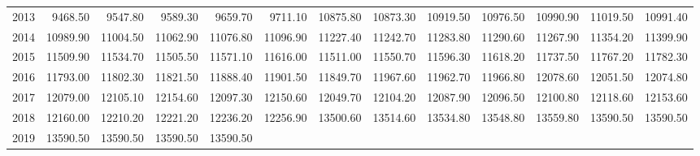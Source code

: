 \begin{longtable}{rrrrrrrrrrrrr}
  2013 & 9468.50 & 9547.80 & 9589.30 & 9659.70 & 9711.10 & 10875.80 & 10873.30 & 10919.50 & 10976.50 & 10990.90 & 11019.50 & 10991.40 \\ 
  2014 & 10989.90 & 11004.50 & 11062.90 & 11076.80 & 11096.90 & 11227.40 & 11242.70 & 11283.80 & 11290.60 & 11267.90 & 11354.20 & 11399.90 \\ 
  2015 & 11509.90 & 11534.70 & 11505.50 & 11571.10 & 11616.00 & 11511.00 & 11550.70 & 11596.30 & 11618.20 & 11737.50 & 11767.20 & 11782.30 \\ 
  2016 & 11793.00 & 11802.30 & 11821.50 & 11888.40 & 11901.50 & 11849.70 & 11967.60 & 11962.70 & 11966.80 & 12078.60 & 12051.50 & 12074.80 \\ 
  2017 & 12079.00 & 12105.10 & 12154.60 & 12097.30 & 12150.60 & 12049.70 & 12104.20 & 12087.90 & 12096.50 & 12100.80 & 12118.60 & 12153.60 \\ 
  2018 & 12160.00 & 12210.20 & 12221.20 & 12236.20 & 12256.90 & 13500.60 & 13514.60 & 13534.80 & 13548.80 & 13559.80 & 13590.50 & 13590.50 \\ 
  2019 & 13590.50 & 13590.50 & 13590.50 & 13590.50 &  &  &  &  &  &  &  &  \\ 
   \hline
\hline
\end{longtable}
